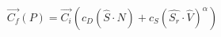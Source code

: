 \documentclass{article}
\begin{document}
\begin{equation}
\vec{C_f}(P) = \vec{C_i}(c_D(\hat{S}\cdot \hat{N}) +c_S(\hat{S_r}\cdot\hat{V})^\alpha)
\end{equation}
\end{document}
